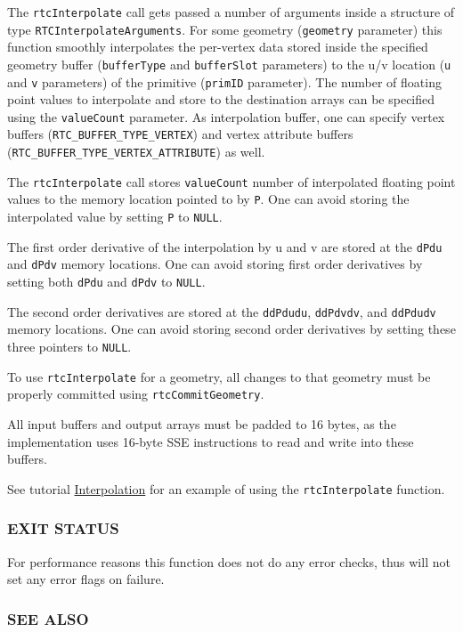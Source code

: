 The \texttt{rtcInterpolate} call gets passed a number of arguments
inside a structure of type \texttt{RTCInterpolateArguments}. For some
geometry (\texttt{geometry} parameter) this function smoothly
interpolates the per-vertex data stored inside the specified geometry
buffer (\texttt{bufferType} and \texttt{bufferSlot} parameters) to the
u/v location (\texttt{u} and \texttt{v} parameters) of the primitive
(\texttt{primID} parameter). The number of floating point values to
interpolate and store to the destination arrays can be specified using
the \texttt{valueCount} parameter. As interpolation buffer, one can
specify vertex buffers (\texttt{RTC\_BUFFER\_TYPE\_VERTEX}) and vertex
attribute buffers (\texttt{RTC\_BUFFER\_TYPE\_VERTEX\_ATTRIBUTE}) as
well.

The \texttt{rtcInterpolate} call stores \texttt{valueCount} number of
interpolated floating point values to the memory location pointed to by
\texttt{P}. One can avoid storing the interpolated value by setting
\texttt{P} to \texttt{NULL}.

The first order derivative of the interpolation by u and v are stored at
the \texttt{dPdu} and \texttt{dPdv} memory locations. One can avoid
storing first order derivatives by setting both \texttt{dPdu} and
\texttt{dPdv} to \texttt{NULL}.

The second order derivatives are stored at the \texttt{ddPdudu},
\texttt{ddPdvdv}, and \texttt{ddPdudv} memory locations. One can avoid
storing second order derivatives by setting these three pointers to
\texttt{NULL}.

To use \texttt{rtcInterpolate} for a geometry, all changes to that
geometry must be properly committed using \texttt{rtcCommitGeometry}.

All input buffers and output arrays must be padded to 16 bytes, as the
implementation uses 16-byte SSE instructions to read and write into
these buffers.

See tutorial \hyperref[interpolation]{Interpolation} for an example of
using the \texttt{rtcInterpolate} function.

\subsubsection{EXIT STATUS}\label{exit-status}

For performance reasons this function does not do any error checks, thus
will not set any error flags on failure.

\subsubsection{SEE ALSO}\label{see-also}

